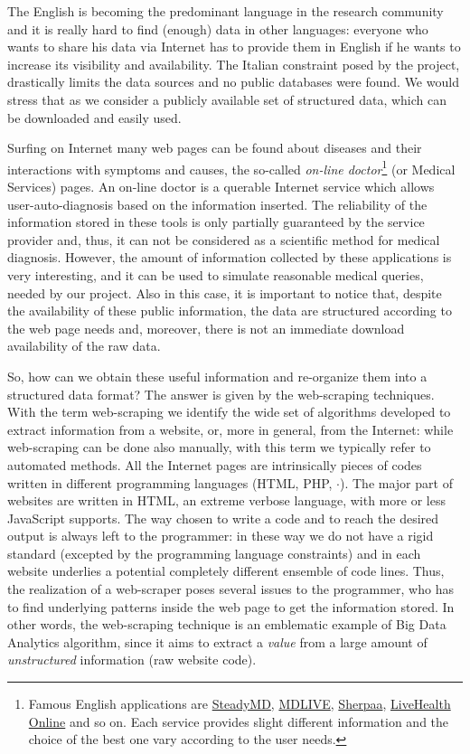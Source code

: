 \documentclass{standalone}
\begin{document}
The English is becoming the predominant language in the research community and it is really hard to find (enough) data in other languages: everyone who wants to share his data via Internet has to provide them in English if he wants to increase its visibility and availability.
The Italian constraint posed by the project, drastically limits the data sources and no public databases were found.
We would stress that as  we consider a publicly available set of structured data, which can be downloaded and easily used.

Surfing on Internet many web pages can be found about diseases and their interactions with symptoms and causes, the so-called \emph{on-line doctor}\footnote{
  Famous English applications are \href{https://www.steadymd.com/?utm_source=bestonlinedoctors&utm_medium=partner&utm_campaign=bizdev}{SteadyMD}, \href{https://www.mdlive.com/}{MDLIVE}, \href{https://sherpaa.com/}{Sherpaa}, \href{https://livehealthonline.com/}{LiveHealth Online} and so on.
  Each service provides slight different information and the choice of the best one vary according to the user needs.
} (or Medical Services) pages.
An on-line doctor is a querable Internet service which allows user-auto-diagnosis based on the information inserted.
The reliability of the information stored in these tools is only partially guaranteed by the service provider and, thus, it can not be considered as a scientific method for medical diagnosis.
However, the amount of information collected by these applications is very interesting, and it can be used to simulate reasonable medical queries, needed by our project.
Also in this case, it is important to notice that, despite the availability of these public information, the data are structured according to the web page needs and, moreover, there is not an immediate download availability of the raw data.

So, how can we obtain these useful information and re-organize them into a structured data format?
The answer is given by the \textsf{web-scraping} techniques.
With the term \textsf{web-scraping} we identify the wide set of algorithms developed to extract information from a website, or, more in general, from the Internet: while \textsf{web-scraping} can be done also manually, with this term we typically refer to automated methods.
All the Internet pages are intrinsically pieces of codes written in different programming languages (\textsf{HTML}, \textsf{PHP}, $\cdot$).
The major part of websites are written in \textsf{HTML}, an extreme verbose language, with more or less \textsf{JavaScript} supports.
The way chosen to write a code and to reach the desired output is always left to the programmer: in these way we do not have a rigid standard (excepted by the programming language constraints) and in each website underlies a potential completely different ensemble of code lines.
Thus, the realization of a web-scraper poses several issues to the programmer, who has to find underlying patterns inside the web page to get the information stored.
In other words, the \textsf{web-scraping} technique is an emblematic example of Big Data Analytics algorithm, since it aims to extract a \emph{value} from a large amount of \emph{unstructured} information (raw website code).
\end{document}
